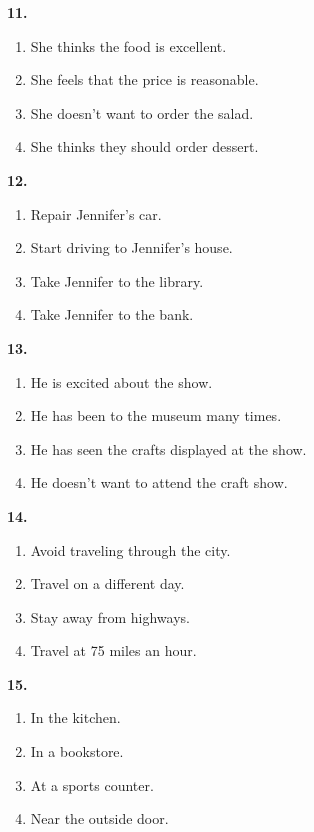 \documentclass[12pt]{article}
\begin{document}
\par
\vspace{0.25\baselineskip}
\noindent\textbf{11.}
\begin{enumerate}[label=(\Alph*),leftmargin=*,itemsep=0.2em]
\item She thinks the food is excellent.
\item She feels that the price is reasonable.
\item She doesn't want to order the salad.
\item She thinks they should order dessert.
\end{enumerate}
\par
\vspace{0.25\baselineskip}
\noindent\textbf{12.}
\begin{enumerate}[label=(\Alph*),leftmargin=*,itemsep=0.2em]
\item Repair Jennifer's car.
\item Start driving to Jennifer's house.
\item Take Jennifer to the library.
\item Take Jennifer to the bank.
\end{enumerate}
\par
\vspace{0.25\baselineskip}
\noindent\textbf{13.}
\begin{enumerate}[label=(\Alph*),leftmargin=*,itemsep=0.2em]
\item He is excited about the show.
\item He has been to the museum many times.
\item He has seen the crafts displayed at the show.
\item He doesn't want to attend the craft show.
\end{enumerate}
\par
\vspace{0.25\baselineskip}
\noindent\textbf{14.}
\begin{enumerate}[label=(\Alph*),leftmargin=*,itemsep=0.2em]
\item Avoid traveling through the city.
\item Travel on a different day.
\item Stay away from highways.
\item Travel at 75 miles an hour.
\end{enumerate}
\par
\vspace{0.25\baselineskip}
\noindent\textbf{15.}
\begin{enumerate}[label=(\Alph*),leftmargin=*,itemsep=0.2em]
\item In the kitchen.
\item In a bookstore.
\item At a sports counter.
\item Near the outside door.
\end{enumerate}
\end{document}
